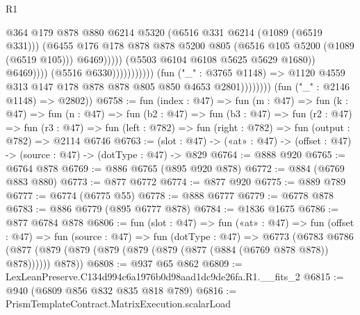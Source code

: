 \begin{lexlean}{R1}
\begin{coremodule}
                                                          @364
                                                          @179
                                                          @878
                                                          @880
                                                          @6214
                                                          @5320
                                                          (@6516 @331 @6214 (@1089 (@6519 @331)))
                                                          (@6455
                                                            @176
                                                            @178
                                                            @878
                                                            @878
                                                            @5200
                                                            @805
                                                            (@6516 @105 @5200 (@1089 (@6519 @105)))
                                                            @6469)))))
                                                  (@5503 @6104 @6108 @5625 @5629 @1680))
                                                @6469))))
                                        (@5516 @6330)))))))))))
                    (fun ("_" : @3765 @1148) =>
                    @1120 @4559 @313 @147 @178 @878 @878 @805 @850 @4653 @2801))))))))
      (fun ("_" : @2146 @1148) => @2802))
@6758 := fun (index : @47) =>
  fun (m : @47) =>
  fun (k : @47) =>
  fun (n : @47) =>
  fun (b2 : @47) =>
  fun (b3 : @47) =>
  fun (r2 : @47) =>
  fun (r3 : @47) => fun (left : @782) => fun (right : @782) => fun (output : @782) => @2114 @6746
@6763 := (slot : @47) -> («at» : @47) -> (offset : @47) -> (source : @47) -> (dotType : @47) -> @829
@6764 := @888 @920
@6765 := @6764 @878
@6769 := @886 @6765 (@895 @920 @878)
@6772 := @884 (@6769 @883 @880)
@6773 := @877 @6772
@6774 := @877 @920
@6775 := @889 @789
@6777 := @6774 (@6775 @55)
@6778 := @888 @6777
@6779 := @6778 @878
@6783 := @886 @6779 (@895 @6777 @878)
@6784 := @1836 @1675
@6786 := @877 @6784 @878
@6806 := fun (slot : @47) =>
  fun («at» : @47) =>
  fun (offset : @47) =>
  fun (source : @47) =>
  fun (dotType : @47) =>
  @6773
    (@6783
      @6786
      (@877 (@879 (@879 (@879 (@879 (@879 (@877 (@884 (@6769 @878 @878)) @878)))))) @878))
@6808 := @937 @65 @862
@6809 := LexLeanPreserve.C134d994c6a1976b0d98aad1dc9de26fa.R1.__fits_2
@6815 := @940 (@6809 @856 @832 @835 @818 @789)
@6816 := PrismTemplateContract.MatrixExecution.scalarLoad

\end{coremodule}
\end{lexlean}
